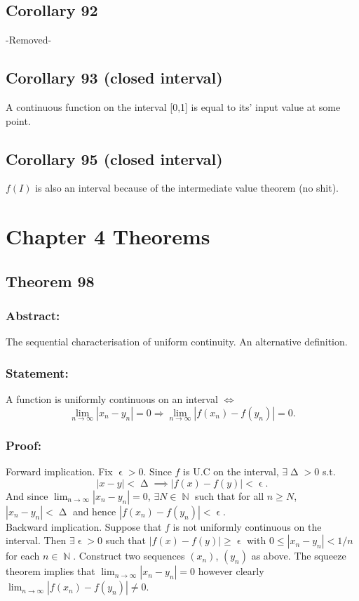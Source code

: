 \documentclass{article}
\DeclareMathOperator\eps{\epsilon}
\DeclareMathOperator\Del{\Delta}
\DeclareMathOperator\N{\mathbb{N}}
\begin{document}
\subsection{Corollary 92}
-Removed-
\subsection{Corollary 93 (closed interval)}
A continuous function on the interval [0,1] is equal to its' input value at some point.
\subsection{Corollary 95 (closed interval)}
$f(I)$ is also an interval because of the intermediate value theorem (no shit).
\section{Chapter 4 Theorems}
\subsection{Theorem 98}
\subsubsection*{Abstract:}
The sequential characterisation of uniform continuity. An alternative definition.
\subsubsection*{Statement:}
A function is uniformly continuous on an interval $\iff$ \[
\lim_{n \to \infty}|x_n-y_n|=0 \Longrightarrow \lim_{n \to \infty}|f(x_n)-f(y_n)| = 0. \]
\subsubsection*{Proof:}
Forward implication. Fix $\eps>0$. Since $f$ is U.C on the interval,
$\exists \Del>0$ s.t. $$|x-y|<\Del \implies |f(x)-f(y)| < \eps.$$
And since $\lim_{n \to \infty}|x_n-y_n| = 0$, $\exists N \in \N$ such that for
all $n \geq N$, $|x_n-y_n| < \Del$ and hence $|f(x_n)-f(y_n)|< \eps$. \\
\newline
Backward implication. Suppose that $f$ is not uniformly continuous
on the interval. Then $\exists \eps>0$ such that $|f(x)-f(y)| \geq \eps$
with $0 \leq |x_n-y_n|<1 \slash n$ for each $n \in \N$. Construct two sequences
$(x_n)$, $(y_n)$ as above. The squeeze theorem implies that $\lim_{n \to \infty}|x_n-y_n| = 0$
however clearly $\lim_{n \to \infty}|f(x_n)-f(y_n)| \neq 0$.
\end{document}
